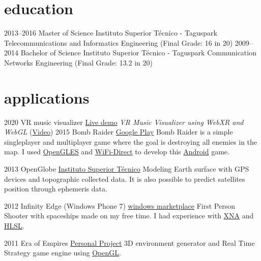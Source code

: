 \documentclass[]{friggeri-cv}
\begin{document}
\section{education}

\begin{entrylist}
   \entry
    {2013–2016}
    {Master of Science}
    {Instituto Superior Técnico - Taguspark}
    {Telecommunications and Informatics Engineering (Final Grade: 16 in 20)}
   \entry
    {2009–2014}
    {Bachelor of Science}
    {Instituto Superior Técnico - Taguspark}
    {Communication Networks Engineering (Final Grade: 13.2 in 20)}

\end{entrylist}



\section{applications}

\begin{entrylist}
  		\entry
		{2020}
		{VR music visualizer}
   		{\href{https://hdlopesrocha.github.io/vrMusic/}{Live demo}}
		{\emph{VR Music Visualizer using WebXR and WebGL} (\href{https://www.youtube.com/watch?v=DSdHLLsvcnM}{Video})}
  \entry
    {2015}
    {Bomb Raider}
    {\href{http://play.google.com/store/apps/details?id=pt.ist.bombraider}{Google Play}}
    {Bomb Raider is a simple singleplayer and multiplayer game where the goal is destroying all enemies in the map. I used \underline{OpenGLES} and \underline{WiFi-Direct} to develop this \underline{Android} game.}

  \entry
    {2013}
    {OpenGlobe}
    {\href{http://web.ist.utl.pt/ist168621/?page=10}{Instituto Superior Técnico}}
    {Modeling Earth surface with GPS devices and topographic collected data. It is also possible to predict satellites position through ephemeris data.}

  \entry
    {2012}
    {Infinity Edge (Windows Phone 7)}
    {\href{http://www.windowsphone.com/en-us/store/app/infinity-edge/05516463-3a89-4351-996e-62e5b4519aeb}{windows marketplace}}
    {First Person Shooter with spaceships made on my free time. I had experience with \underline{XNA} and \underline{HLSL}.}

  \entry
    {2011}
    {Era of Empires}
    {\href{http://web.ist.utl.pt/ist168621/?page=8}{Personal Project}}
    {3D environment generator and Real Time Strategy game engine using \underline{OpenGL}.}


\end{entrylist}
\end{document}

